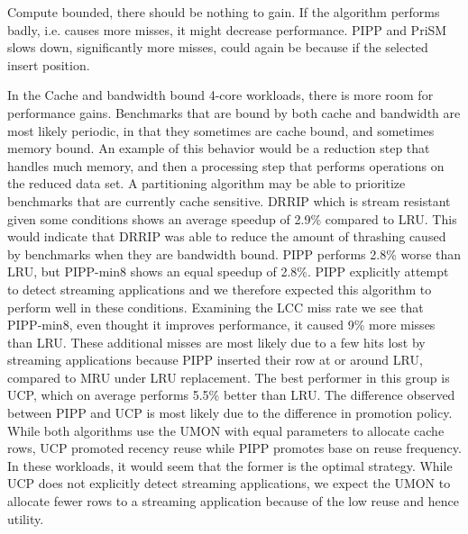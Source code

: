 Compute bounded, there should be nothing to gain. If the algorithm performs badly, i.e. causes more misses, it might decrease performance.
PIPP and PriSM slows down, significantly more misses, could again be because if the selected insert position. 

In the Cache and bandwidth bound 4-core workloads, there is more room for performance gains. 
Benchmarks that are bound by both cache and bandwidth are most likely periodic, in that they sometimes are cache bound, and sometimes memory bound.
An example of this behavior would be a reduction step that handles much memory, and then a processing step that performs operations on the reduced data set.
A partitioning algorithm may be able to prioritize benchmarks that are currently cache sensitive.
DRRIP which is stream resistant given some conditions  shows an average speedup of 2.9\% compared to LRU. 
This would indicate that DRRIP was able to reduce the amount of thrashing caused by benchmarks when they are bandwidth bound.
PIPP performs 2.8\% worse than LRU, but PIPP-min8 shows an equal speedup of 2.8\%. 
PIPP explicitly attempt to detect streaming applications and we therefore expected this algorithm to perform well in these conditions.
Examining the LCC miss rate we see that PIPP-min8, even thought it improves performance, it caused 9\% more misses than LRU.
These additional misses are most likely due to a few hits lost by streaming applications because PIPP inserted their row at or around LRU, compared to MRU under LRU replacement. 
The best performer in this group is UCP, which on average performs 5.5\% better than LRU.
The difference observed between PIPP and UCP is most likely due to the difference in promotion policy.
While both algorithms use the UMON with equal parameters to allocate cache rows, UCP promoted recency reuse while PIPP promotes base on reuse frequency. 
In these workloads, it would seem that the former is the optimal strategy.
While UCP does not explicitly detect streaming applications, we expect the UMON to allocate fewer rows to a streaming application because of the low reuse and hence utility. 

